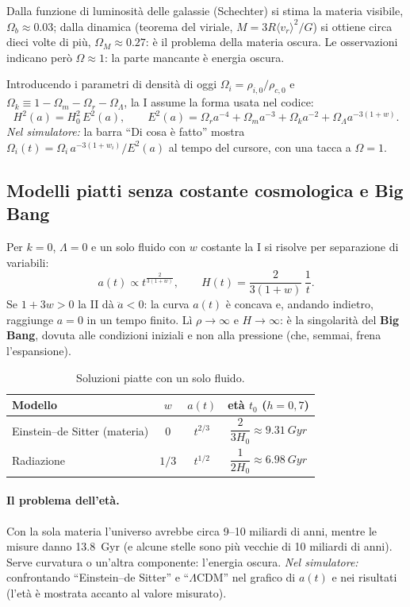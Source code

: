 \documentclass[11pt,a4paper]{article}
\newcommand{\Om}{\Omega_m}
\newcommand{\Or}{\Omega_r}
\newcommand{\OL}{\Omega_\Lambda}
\newcommand{\Ok}{\Omega_k}
\begin{document}
Dalla funzione di luminosità delle galassie (Schechter) si stima la materia visibile, $\Omega_b\approx\num{0.03}$; dalla dinamica (teorema del viriale, $M=3R\langle v_r\rangle^2/G$) si ottiene circa dieci volte di più, $\Omega_M\approx\num{0.27}$: è il problema della materia oscura. Le osservazioni indicano però $\Omega\approx1$: la parte mancante è energia oscura.

Introducendo i parametri di densità di oggi $\Omega_{i}=\rho_{i,0}/\rho_{c,0}$ e $\Ok\equiv1-\Om-\Or-\OL$, la I assume la forma usata nel codice:
\begin{equation}
  H^2(a) = H_0^2\,E^2(a), \qquad
  E^2(a) = \Or a^{-4} + \Om a^{-3} + \Ok a^{-2} + \OL a^{-3(1+w)} .
  \label{eq:E2}
\end{equation}
\emph{Nel simulatore:} la barra ``Di cosa è fatto'' mostra $\Omega_i(t)=\Omega_i\,a^{-3(1+w_i)}/E^2(a)$ al tempo del cursore, con una tacca a $\Omega=1$.

\subsection{Modelli piatti senza costante cosmologica e Big Bang}
Per $k=0$, $\Lambda=0$ e un solo fluido con $w$ costante la I si risolve per separazione di variabili:
\begin{equation}
  a(t)\propto t^{\frac{2}{3(1+w)}}, \qquad H(t)=\frac{2}{3(1+w)}\,\frac1t .
\end{equation}
Se $1+3w>0$ la II dà $\ddot a<0$: la curva $a(t)$ è concava e, andando indietro, raggiunge $a=0$ in un tempo finito. Lì $\rho\to\infty$ e $H\to\infty$: è la singolarità del \textbf{Big Bang}, dovuta alle condizioni iniziali e non alla pressione (che, semmai, frena l'espansione).

\begin{table}[H]\centering\small
\begin{tabular}{@{}lccc@{}}
\toprule
Modello & $w$ & $a(t)$ & età $t_0$ ($h=0{,}7$)\\
\midrule
Einstein--de Sitter (materia) & $0$ & $t^{2/3}$ & $\dfrac{2}{3H_0}\approx\SI{9.31}{Gyr}$\\[6pt]
Radiazione & $1/3$ & $t^{1/2}$ & $\dfrac{1}{2H_0}\approx\SI{6.98}{Gyr}$\\
\bottomrule
\end{tabular}
\caption{Soluzioni piatte con un solo fluido.}
\end{table}

\paragraph{Il problema dell'età.} Con la sola materia l'universo avrebbe circa 9--10 miliardi di anni, mentre le misure danno \SI{13.8}{Gyr} (e alcune stelle sono più vecchie di 10 miliardi di anni). Serve curvatura o un'altra componente: l'energia oscura.
\emph{Nel simulatore:} confrontando ``Einstein--de Sitter'' e ``$\Lambda$CDM'' nel grafico di $a(t)$ e nei risultati (l'età è mostrata accanto al valore misurato).
\end{document}
